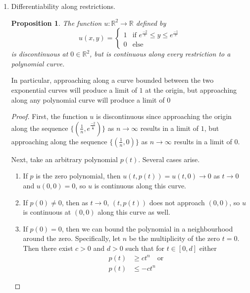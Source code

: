 \documentclass[letterpaper,11pt]{article}
\newtheorem{prop}{Proposition}
\newcommand{\R}{\mathbb{R}}
\begin{document}
\begin{enumerate}
    \item Differentiability along restrictions.

        \begin{prop}
            The function $u : \R^2 \to \R$ defined by
            \begin{equation*}
                u(x, y) = \begin{cases}
                    1 &\text{if } e^\frac{-2}{x} \leq y \leq e^\frac{-1}{x} \\
                    0 &\text{else}
                \end{cases}
            \end{equation*}
            is discontinuous at $0 \in \R^2$, but is continuous along every
            restriction to a polynomial curve.
        \end{prop}

        In particular, approaching along a curve bounded between the two
        exponential curves will produce a limit of $1$ at the origin, but
        approaching along any polynomial curve will produce a limit of $0$

        \begin{proof}
            First, the function $u$ is discontinuous since approaching the
            origin along the sequence
            $\{(\frac{1}{n}, e^\frac{-2}{\frac{1}{n}})\}$ as $n \to \infty$
            results in a limit of $1$, but approaching along the sequence
            $\{(\frac{1}{n}, 0)\}$ as $n \to \infty$ results in a limit of $0$.

            Next, take an arbitrary polynomial $p(t)$. Several cases arise.
            \begin{enumerate}
                \item If $p$ is the zero polynomial, then
                    $u(t, p(t)) = u(t, 0) \to 0$ as
                    $t \to 0$ and $u(0, 0) = 0$, so $u$ is continuous along
                    this curve.

                \item If $p(0) \neq 0$, then as $t \to 0$, $(t, p(t))$ does not
                    approach $(0, 0)$, so $u$ is continuous at $(0, 0)$ along
                    this curve as well.

                \item If $p(0) = 0$, then we can bound the polynomial in a
                    neighbourhood around the zero. Specifically, let $n$ be the
                    multiplicity of the zero $t = 0$. Then there exist $c > 0$
                    and $d > 0$ such that for $t \in [0, d]$ either
                    \begin{align*}
                        p(t) &\geq ct^n \quad \text{or}\\
                        p(t) &\leq -ct^n
                    \end{align*}


\end{enumerate}
\end{proof}
\end{enumerate}
\end{document}
